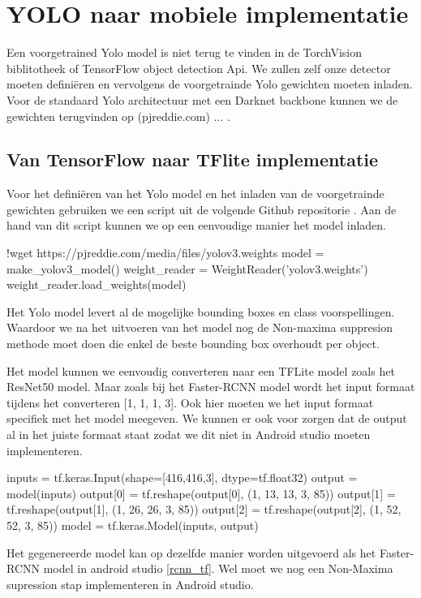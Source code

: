 \section{YOLO naar mobiele implementatie}
Een voorgetrained Yolo model is niet terug te vinden in de TorchVision biblitotheek of TensorFlow object detection Api.
We zullen zelf onze detector moeten defini\"eren en vervolgens de voorgetrainde Yolo gewichten moeten inladen.
Voor de standaard Yolo architectuur met een Darknet backbone kunnen we de gewichten terugvinden op (pjreddie.com) ... .

\subsection{Van TensorFlow naar TFlite implementatie}
Voor het defini\"eren van het Yolo model en het inladen van de voorgetrainde gewichten gebruiken we een script uit de volgende Github repositorie \cite{anh_yolo3_2021} .
Aan de hand van dit script kunnen we op een eenvoudige manier het model inladen.

\begin{python}
!wget https://pjreddie.com/media/files/yolov3.weights
model = make_yolov3_model()
weight_reader = WeightReader('yolov3.weights')
weight_reader.load_weights(model)
\end{python}

Het Yolo model levert al de mogelijke bounding boxes en class voorspellingen.
Waardoor we na het uitvoeren van het model nog de Non-maxima suppresion methode moet doen die enkel de beste bounding box overhoudt per object.

Het model kunnen we eenvoudig converteren naar een TFLite model zoals het ResNet50 model.
Maar zoals bij het Faster-RCNN model wordt het input formaat tijdens het converteren [1, 1, 1, 3].
Ook hier moeten we het input formaat specifiek met het model meegeven.
We kunnen er ook voor zorgen dat de output al in het juiste formaat staat zodat we dit niet in Android studio moeten implementeren.

\begin{python}
inputs = tf.keras.Input(shape=[416,416,3], dtype=tf.float32)
output = model(inputs)
output[0] =  tf.reshape(output[0], (1, 13, 13, 3, 85))
output[1] =  tf.reshape(output[1], (1, 26, 26, 3, 85))
output[2] =  tf.reshape(output[2], (1, 52, 52, 3, 85))
model = tf.keras.Model(inputs, output)
\end{python}

Het gegenereerde model kan op dezelfde manier worden uitgevoerd als het Faster-RCNN model in android studio \ref{rcnn_tf}.
Wel moet we nog een Non-Maxima supression stap implementeren in Android studio.

